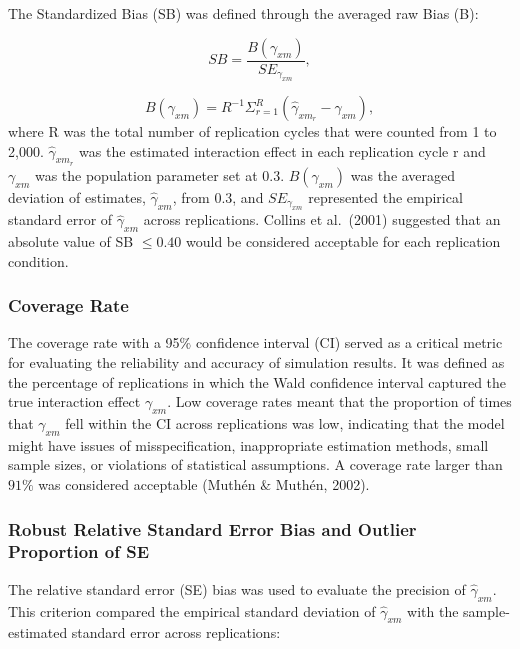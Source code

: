 \documentclass[
  man]{apa7}
\begin{document}
The Standardized Bias (SB) was defined through the averaged raw Bias (B):

\begin{equation}
SB = \frac{B(\gamma_{xm})}{SE_{\gamma_{xm}}},
\end{equation}

\begin{equation}
B(\gamma_{xm}) = R^{-1}\Sigma^{R}_{r = 1}(\hat{\gamma}_{xm_{r}} - \gamma_{xm}),
\end{equation}
where R was the total number of replication cycles that were counted from 1 to 2,000. \(\hat{\gamma}_{xm_{r}}\) was the estimated interaction effect in each replication cycle r and \(\gamma_{xm}\) was the population parameter set at 0.3. \(B(\gamma_{xm})\) was the averaged deviation of estimates, \(\hat{\gamma}_{xm}\), from 0.3, and \(SE_{\gamma_{xm}}\) represented the empirical standard error of \(\hat{\gamma}_{xm}\) across replications. Collins et al.~(2001) suggested that an absolute value of SB \(\le 0.40\) would be considered acceptable for each replication condition.

\hypertarget{coverage-rate}{%
\subsubsection{Coverage Rate}\label{coverage-rate}}

The coverage rate with a 95\(\%\) confidence interval (CI) served as a critical metric for evaluating the reliability and accuracy of simulation results. It was defined as the percentage of replications in which the Wald confidence interval captured the true interaction effect \(\gamma_{xm}\). Low coverage rates meant that the proportion of times that \(\gamma_{xm}\) fell within the CI across replications was low, indicating that the model might have issues of misspecification, inappropriate estimation methods, small sample sizes, or violations of statistical assumptions. A coverage rate larger than \(91\%\) was considered acceptable (Muthén \(\&\) Muthén, 2002).

\hypertarget{robust-relative-standard-error-bias-and-outlier-proportion-of-se}{%
\subsubsection{Robust Relative Standard Error Bias and Outlier Proportion of SE}\label{robust-relative-standard-error-bias-and-outlier-proportion-of-se}}

The relative standard error (SE) bias was used to evaluate the precision of \(\hat{\gamma}_{xm}\). This criterion compared the empirical standard deviation of \(\hat{\gamma}_{xm}\) with the sample-estimated standard error across replications:
\end{document}
